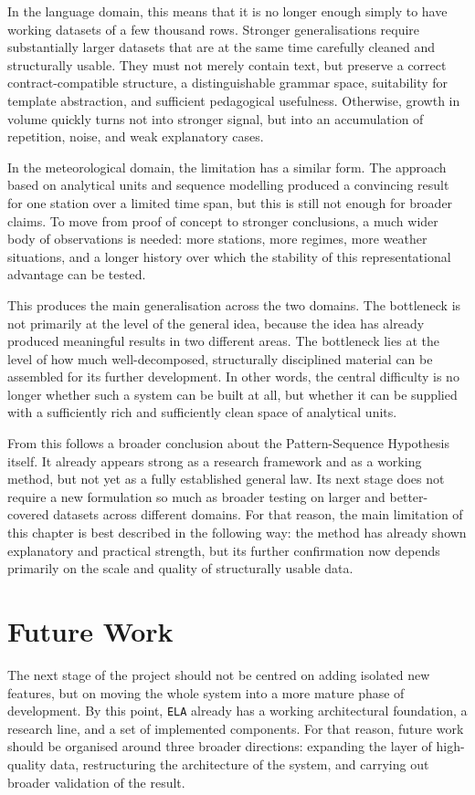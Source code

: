 \documentclass[12pt,a4paper,oneside]{report}
\begin{document}
In the language domain, this means that it is no longer enough simply to have working datasets of a few thousand rows. Stronger generalisations require substantially larger datasets that are at the same time carefully cleaned and structurally usable. They must not merely contain text, but preserve a correct contract-compatible structure, a distinguishable grammar space, suitability for template abstraction, and sufficient pedagogical usefulness. Otherwise, growth in volume quickly turns not into stronger signal, but into an accumulation of repetition, noise, and weak explanatory cases.

In the meteorological domain, the limitation has a similar form. The approach based on analytical units and sequence modelling produced a convincing result for one station over a limited time span, but this is still not enough for broader claims. To move from proof of concept to stronger conclusions, a much wider body of observations is needed: more stations, more regimes, more weather situations, and a longer history over which the stability of this representational advantage can be tested.

This produces the main generalisation across the two domains. The bottleneck is not primarily at the level of the general idea, because the idea has already produced meaningful results in two different areas. The bottleneck lies at the level of how much well-decomposed, structurally disciplined material can be assembled for its further development. In other words, the central difficulty is no longer whether such a system can be built at all, but whether it can be supplied with a sufficiently rich and sufficiently clean space of analytical units.

From this follows a broader conclusion about the Pattern-Sequence Hypothesis itself. It already appears strong as a research framework and as a working method, but not yet as a fully established general law. Its next stage does not require a new formulation so much as broader testing on larger and better-covered datasets across different domains. For that reason, the main limitation of this chapter is best described in the following way: the method has already shown explanatory and practical strength, but its further confirmation now depends primarily on the scale and quality of structurally usable data.

\section{Future Work}
The next stage of the project should not be centred on adding isolated new features, but on moving the whole system into a more mature phase of development. By this point, \texttt{ELA} already has a working architectural foundation, a research line, and a set of implemented components. For that reason, future work should be organised around three broader directions: expanding the layer of high-quality data, restructuring the architecture of the system, and carrying out broader validation of the result.
\end{document}
